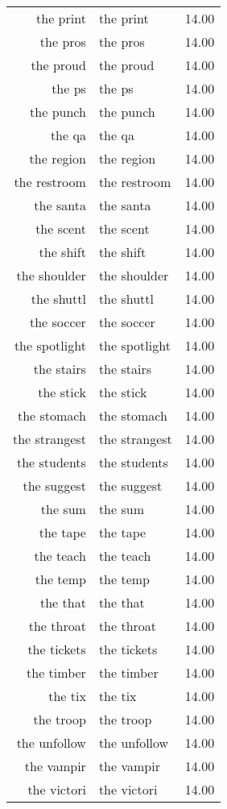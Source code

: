 \begin{table}[ht]
\begin{tabular}{rlr}
  the print & the print & 14.00 \\ 
  the pros & the pros & 14.00 \\ 
  the proud & the proud & 14.00 \\ 
  the ps & the ps & 14.00 \\ 
  the punch & the punch & 14.00 \\ 
  the qa & the qa & 14.00 \\ 
  the region & the region & 14.00 \\ 
  the restroom & the restroom & 14.00 \\ 
  the santa & the santa & 14.00 \\ 
  the scent & the scent & 14.00 \\ 
  the shift & the shift & 14.00 \\ 
  the shoulder & the shoulder & 14.00 \\ 
  the shuttl & the shuttl & 14.00 \\ 
  the soccer & the soccer & 14.00 \\ 
  the spotlight & the spotlight & 14.00 \\ 
  the stairs & the stairs & 14.00 \\ 
  the stick & the stick & 14.00 \\ 
  the stomach & the stomach & 14.00 \\ 
  the strangest & the strangest & 14.00 \\ 
  the students & the students & 14.00 \\ 
  the suggest & the suggest & 14.00 \\ 
  the sum & the sum & 14.00 \\ 
  the tape & the tape & 14.00 \\ 
  the teach & the teach & 14.00 \\ 
  the temp & the temp & 14.00 \\ 
  the that & the that & 14.00 \\ 
  the throat & the throat & 14.00 \\ 
  the tickets & the tickets & 14.00 \\ 
  the timber & the timber & 14.00 \\ 
  the tix & the tix & 14.00 \\ 
  the troop & the troop & 14.00 \\ 
  the unfollow & the unfollow & 14.00 \\ 
  the vampir & the vampir & 14.00 \\ 
  the victori & the victori & 14.00 \\ 

\end{tabular}
\end{table}

